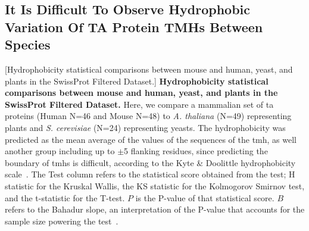 \subsection{It Is Difficult To Observe Hydrophobic Variation Of TA Protein TMHs Between Species}

\begin{table}[htbp]
\centering
{}[Hydrophobicity statistical comparisons between mouse and human, yeast, and plants in the SwissProt Filtered Dataset.]
{\textbf{Hydrophobicity statistical comparisons between mouse and human, yeast, and plants in the SwissProt Filtered Dataset.}
Here, we compare a mammalian set of \gls{ta} proteins (Human N=46 and Mouse N=48) to \textit{A. thaliana} (N=49) representing plants  and  \textit{S. cerevisiae} (N=24) representing yeasts.
The hydrophobicity was predicted as the mean average of the values of the sequences of the \gls{tmh}, as well another group including up to $\pm$5 flanking residues, since predicting the boundary of \gls{tmh}s is difficult, according to the Kyte \& Doolittle hydrophobicity scale~\cite{Kyte1982}.
The Test column refers to the statistical score obtained from the test; H statistic for the Kruskal Wallis, the KS statistic for the Kolmogorov Smirnov test, and the t-statistic for the T-test.
$P$ is the P-value of that statistical score.
$B$ refers to the Bahadur slope, an interpretation of the P-value that accounts for the sample size powering the test~\cite{Bahadur1967, Bahadur1971}.}
\tiny


\end{table}
